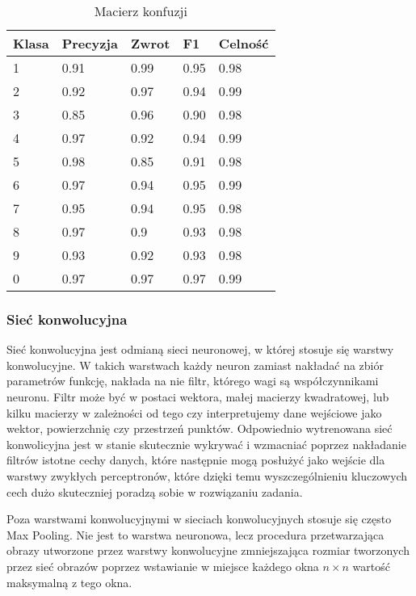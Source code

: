 \documentclass{article}
\begin{document}
\begin{table}[H]
    \centering
    \begin{tabular}{|l|l|l|l|l|}
    \hline
    Klasa & Precyzja & Zwrot & F1 & Celność \\
    \hline
    1     & 0.91     & 0.99  & 0.95 & 0.98    \\
    2     & 0.92     & 0.97  & 0.94 & 0.99    \\
    3     & 0.85     & 0.96  & 0.90 & 0.98    \\
    4     & 0.97     & 0.92  & 0.94 & 0.99    \\
    5     & 0.98     & 0.85  & 0.91 & 0.98    \\
    6     & 0.97     & 0.94  & 0.95 & 0.99    \\
    7     & 0.95     & 0.94  & 0.95 & 0.98    \\
    8     & 0.97     & 0.9   & 0.93 & 0.98    \\
    9     & 0.93     & 0.92  & 0.93 & 0.98    \\
    0     & 0.97     & 0.97  & 0.97 & 0.99   \\
    \hline
    \end{tabular}
    \caption{Macierz konfuzji}
\end{table}

\subsubsection{Sieć konwolucyjna}
Sieć konwolucyjna jest odmianą sieci neuronowej, 
w której stosuje się warstwy konwolucyjne. W takich 
warstwach każdy neuron zamiast nakładać na zbiór parametrów 
funkcję, nakłada na nie filtr, którego wagi są współczynnikami 
neuronu. Filtr może być w postaci wektora, małej macierzy kwadratowej, 
lub kilku macierzy w zależności od tego czy interpretujemy dane wejściowe 
jako wektor, powierzchnię czy przestrzeń punktów. Odpowiednio wytrenowana 
sieć konwolicyjna jest w stanie skutecznie wykrywać i wzmacniać poprzez 
nakładanie filtrów istotne cechy danych, które następnie mogą posłużyć 
jako wejście dla warstwy zwykłych perceptronów, które dzięki temu wyszczególnieniu 
kluczowych cech dużo skuteczniej poradzą sobie w rozwiązaniu zadania.

Poza warstwami konwolucyjnymi w sieciach konwolucyjnych stosuje się 
często Max Pooling. Nie jest to warstwa neuronowa, lecz procedura 
przetwarzająca obrazy utworzone przez warstwy konwolucyjne zmniejszająca 
rozmiar tworzonych przez sieć obrazów poprzez wstawianie w miejsce każdego 
okna $n \times n$ wartość maksymalną z tego okna.
\end{document}
